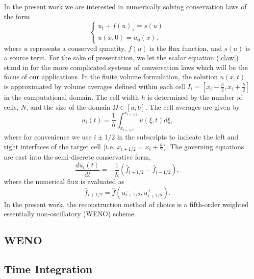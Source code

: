 \documentclass[12pt,letterpaper]{article}
\begin{document}
    In the present work we are interested in numerically solving conservation
    laws of the form
    \begin{equation}
    \begin{cases}
      u_{t} + f(u)_{x} = s(u) \\    
      u(x,0) = u_{0}(x),
    \end{cases}
    \label{claw}
    \end{equation} where $u$ represents a conserved quantity, $f(u)$ is the flux
    function, and $s(u)$ is a source term. For the sake of presentation, we let
    the scalar equation (\ref{claw}) stand in for the more complicated systems
    of conversation laws which will be the focus of our applications.  In the
    finite volume formulation, the solution $u(x,t)$ is approximated by volume
    averages defined within each cell $I_{i} = \left[ x_{i}-\frac{h}{2},
    x_{i}+\frac{h}{2} \right]$ in the computational domain.  The cell width $h$
    is determined by the number of cells, $N$, and the size of the domain
    $\Omega \in \left[a,b\right]$.  The cell averages are given by
    \begin{equation}
        u_{i}(t) = \frac{1}{h} \int_{x_{i-1/2}}^{x_{i+1/2}} u(\xi,t) d \xi,
    \end{equation}
    where for convenience we use $i \pm 1/2$ in the subscripts to
    indicate the left and right interfaces of the target cell (i.e.
    $x_{i+1/2} =
    x_{i} + \frac{h}{2}$). The governing equations are cast into the
    semi-discrete conservative form,
    \begin{equation}
        \frac{du_{i}(t)}{dt} = -\frac{1}{h} \left( \hat{f}_{i+1/2} -
        \hat{f}_{i-1/2} \right),
        \label{ode}
    \end{equation}
    where the numerical flux is evaluated as
    \begin{equation}
        \hat{f}_{i + 1/2} = \hat{f}(u^{-}_{i+1/2}, u^{+}_{i+1/2}).
    \end{equation}
    In the present work, the reconstruction method of choice is a fifth-order
    weighted essentially non-oscillatory (WENO) scheme.

    \subsection{WENO}

    \subsection{Time Integration}
\end{document}
